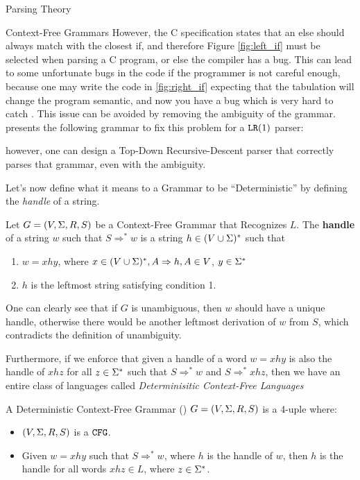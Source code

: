 \begin{section}{Parsing Theory}
\begin{subsection}{Context-Free Grammars}
However, the C specification states that an else should always match with the closest
if, and therefore Figure \ref{fig:left_if} must be selected
when parsing a C program, or else the compiler has a bug. This can lead
to some unfortunate bugs in the code if the programmer is not careful enough,
because one may write the code in \ref{fig:right_if} expecting that the
tabulation will change the program semantic, and now you have a bug which is
very hard to catch \citep{ritchie1988c}. This issue can be avoided by removing the
ambiguity of the grammar. \cite{dragonbook} presents the following grammar
to fix this problem for a $\texttt{LR}(1)$ parser:
\vspace*{-0.5cm}

however, one can design a Top-Down Recursive-Descent parser that correctly
parses that grammar, even with the ambiguity.

Let's now define what it means to a Grammar to be ``Deterministic'' by
defining the \textit{handle} of a string.

\begin{definition}
	Let $G = (V, \Sigma, R, S)$ be a Context-Free Grammar that Recognizes $L$.
	The \textbf{handle} of a string $w$ such that $S \Rightarrow^* w$ is a string
	$h \in (V \cup \Sigma)^*$ such that
	\begin{enumerate}
	  \item $w = xhy$, where $x \in (V \cup \Sigma)^*, A \Rightarrow h, A \in V$,
	  $y \in \Sigma^*$
	  \item $h$ is the leftmost string satisfying condition 1.
	\end{enumerate}
\end{definition}

One can clearly see that if $G$ is unambiguous, then $w$ should have a unique
handle, otherwise there would be another leftmost derivation of $w$ from $S$, which
contradicts the definition of unambiguity.

Furthermore, if we enforce that given a handle of a word $w = xhy$
is also the handle of $xhz $ for all $z \in \Sigma^*$ such that $S \Rightarrow^* w$ and
$S \Rightarrow^* xhz$, then we have an entire
class of languages called \textit{Determinisitic Context-Free Languages}

\begin{definition}
A Deterministic Context-Free Grammar () $G = (V, \Sigma, R, S)$ is a 4-uple where:
	\begin{itemize}
		\item $(V, \Sigma, R, S)$ is a $\texttt{CFG}$.
		\item Given $w = xhy$ such that $S \Rightarrow^* w$, where $h$ is the handle
		of $w$, then $h$ is the handle for all words $xhz \in L$, where $z \in \Sigma^*$.
	\end{itemize}
\end{definition}


\end{subsection}
\end{section}
